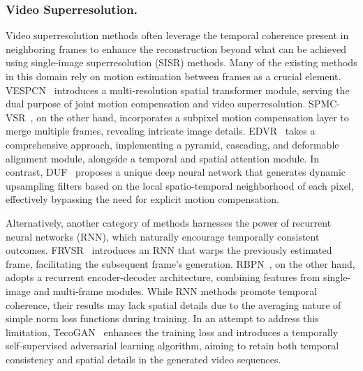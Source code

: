 \subsubsection{Video Superresolution.}
Video superresolution methods often leverage the temporal coherence present in neighboring frames to enhance the reconstruction beyond what can be achieved using single-image superresolution (SISR) methods.
Many of the existing methods in this domain rely on motion estimation between frames as a crucial element. VESPCN~\cite{caballero2017real} introduces a multi-resolution spatial transformer module, serving the dual purpose of joint motion compensation and video superresolution. SPMC-VSR~\cite{tao2017detail}, on the other hand, incorporates a subpixel motion compensation layer to merge multiple frames, revealing intricate image details. EDVR~\cite{wang2019edvr} takes a comprehensive approach, implementing a pyramid, cascading, and deformable alignment module, alongside a temporal and spatial attention module. In contrast, DUF~\cite{jo2018deep} proposes a unique deep neural network that generates dynamic upsampling filters based on the local spatio-temporal neighborhood of each pixel, effectively bypassing the need for explicit motion compensation.

Alternatively, another category of methods harnesses the power of recurrent neural networks (RNN), which naturally encourage temporally consistent outcomes. FRVSR~\cite{vemulapalli2020frame} introduces an RNN that warps the previously estimated frame, facilitating the subsequent frame's generation. RBPN~\cite{haris2019recurrent}, on the other hand, adopts a recurrent encoder-decoder architecture, combining features from single-image and multi-frame modules. While RNN methods promote temporal coherence, their results may lack spatial details due to the averaging nature of simple norm loss functions during training. In an attempt to address this limitation, TecoGAN~\cite{chu2020learning} enhances the training loss and introduces a temporally self-supervised adversarial learning algorithm, aiming to retain both temporal consistency and spatial details in the generated video sequences.

